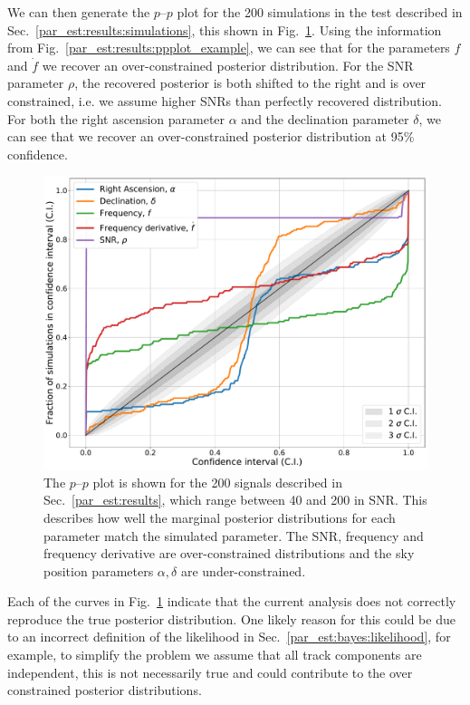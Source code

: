 We can then generate the $p$--$p$ plot for the 200 simulations in the test described in Sec.~\ref{par_est:results:simulations}, this shown
in Fig.~\ref{par_est:results:ppplot}.  Using the information from Fig.~\ref{par_est:results:ppplot_example}, we can see that for the parameters $f$
and $\dot{f}$ we recover an over-constrained posterior
distribution.  For the \gls{SNR} parameter $\rho$, the recovered posterior is
both shifted to the right and is over constrained, i.e. we assume higher
\glspl{SNR} than perfectly recovered distribution.  For both the right
ascension parameter $\alpha$ and the declination parameter $\delta$, we can see
that we recover an over-constrained posterior distribution at 95\% confidence.  

%
\begin{figure}[ht]
    \centering
    \includegraphics[width=\linewidth]{C5_parameter/ppplot.pdf}
    \caption[$p$--$p$ plot for the CW simulations]{The $p$--$p$ plot is shown for the 200
signals described in Sec.~\ref{par_est:results}, which range between 40 and 200
in \gls{SNR}. This describes how well the marginal posterior distributions for
each parameter match the simulated parameter. The \gls{SNR}, frequency and
frequency derivative are over-constrained distributions and the sky position parameters
$\alpha,\delta$ are under-constrained.} \label{par_est:results:ppplot}
\end{figure}

Each of the curves in Fig.~\ref{par_est:results:ppplot} indicate that the
current analysis does not correctly reproduce the true posterior distribution.
One likely reason for this could be due to an incorrect definition of the likelihood in Sec.~\ref{par_est:bayes:likelihood}, for example, to simplify the problem we assume
that all track components are independent, this is not necessarily true and
could contribute to the over constrained posterior
distributions.

